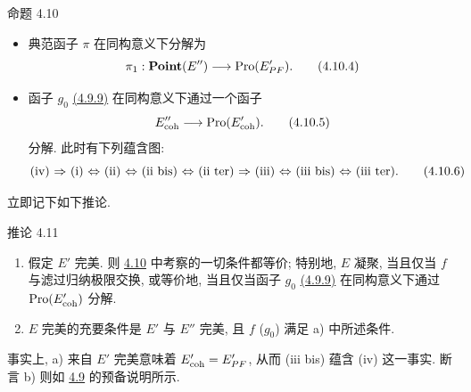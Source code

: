 \begin{enonce*}{命题 4.10}
\begin{itemize}
\item[(iii ter)] 典范函子 $\pi$
在同构意义下分解为
\begin{equation*}
\pi_1 : \Ppoint(E'') \to \Pro(E'_{PF}){\quoi}.\tag{4.10.4}
\end{equation*}

\item[(iv)] 函子 $g_0$
\hyperlink{sga4.exp.VI.equation.4.9.9}{(4.9.9)}
在同构意义下通过一个函子
\begin{equation*}
E''_{\coh} \to \Pro(E'_{\coh}){\quoi}.\tag{4.10.5}
\end{equation*}
分解. 此时有下列蕴含图:
\begin{equation*}
\text{\rm (iv) $\Rightarrow$ (i) $\Leftrightarrow$ (ii) $\Leftrightarrow$ (ii bis)
  $\Leftrightarrow$ (ii ter) $\Rightarrow$ (iii) $\Leftrightarrow$ (iii bis)
  $\Leftrightarrow$ (iii ter)}{}.\tag{4.10.6}
\end{equation*}
\end{itemize}
\end{enonce*}

立即记下如下推论.

\begin{enonce*}{推论 4.11}
\begin{enumerate}
\renewcommand{\theenumi}{\alph{enumi}}
\renewcommand{\labelenumi}{\theenumi)}
\item 假定 $E'$ 完美.
则 \hyperref[VI.prop4.10]{4.10} 中考察的一切条件都等价;
特别地, $E$ 凝聚, 当且仅当 $f$ 与滤过归纳极限交换,
或等价地, 当且仅当函子 $g_0$
\hyperlink{sga4.exp.VI.equation.4.9.9}{(4.9.9)}
在同构意义下\pageoriginale{}通过 $\operatorname{Pro}(E'_{\mathrm{coh}})$ 分解.

\item $E$ 完美的充要条件是 $E'$ 与 $E''$ 完美,
且 $f$ (\resp $g_0$) 满足 {\rm a)} 中所述条件.
\end{enumerate}
\end{enonce*}

事实上, a) 来自 $E'$ 完美意味着 $E'_{\mathrm{coh}}=E'_{PF}$,
从而 (iii bis) 蕴含 (iv) 这一事实.
断言 b) 则如 \hyperref[VI.subsec4.9]{4.9} 的预备说明所示.


\setcounter{subsection}{11}



